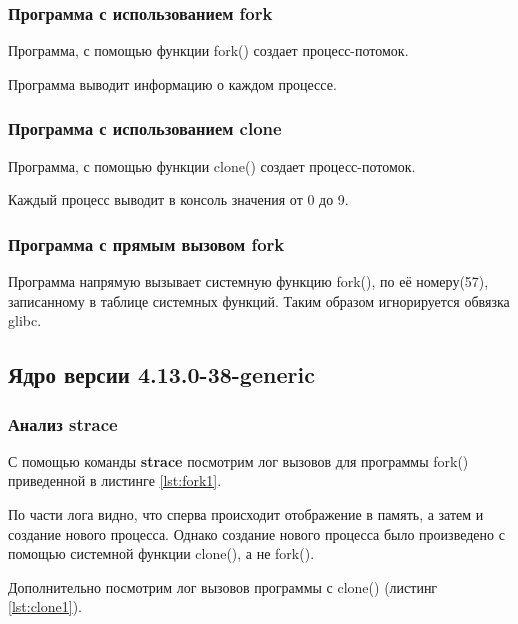 \subsubsection{Программа с использованием fork}
Программа, с помощью функции fork() создает процесс-потомок.

Программа выводит информацию о каждом процессе.

\subsubsection{Программа с использованием clone}
Программа, с помощью функции clone() создает процесс-потомок.

Каждый процесс выводит в консоль значения от 0 до 9.

\subsubsection{Программа с прямым вызовом fork}
Программа напрямую вызывает системную функцию fork(), по её номеру(57), записанному в таблице системных функций. Таким образом игнорируется обвязка glibc.



\subsection{Ядро версии 4.13.0-38-generic}
\subsubsection{Анализ strace}
С помощью команды \textbf{strace} посмотрим лог вызовов для программы fork() приведенной в листинге \ref{lst:fork1}.

По части лога видно, что сперва происходит отображение в память, а затем и создание нового процесса. Однако создание нового процесса было произведено с помощью системной функции clone(), а не fork().

Дополнительно посмотрим лог вызовов программы с clone() (листинг \ref{lst:clone1}).



